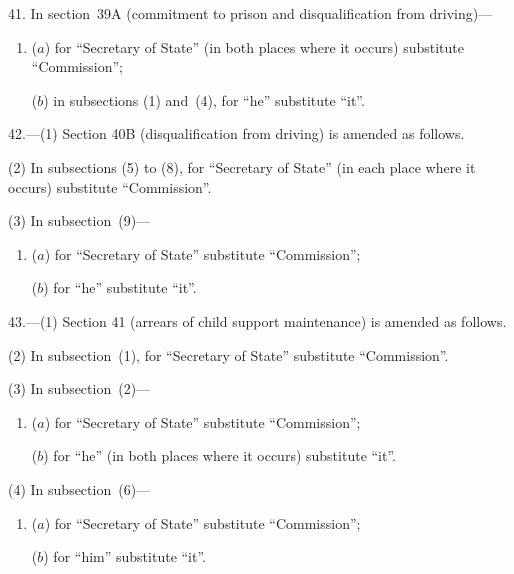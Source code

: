\documentclass[12pt,a4paper]{article}
\begin{document}

\medskip

41. In section~39A (commitment to prison and disqualification from driving)—
\begin{enumerate}\item[]
($a$) for “Secretary of State” (in both places where it occurs) substitute “Commission”;

($b$) in subsections (1) and~(4), for “he” substitute “it”.
\end{enumerate}

\medskip

42.---(1) Section 40B (disqualification from driving) is amended as follows.

(2) In subsections (5) to (8), for “Secretary of State” (in each place where it occurs) substitute “Commission”.

(3) In subsection~(9)—
\begin{enumerate}\item[]
($a$) for “Secretary of State” substitute “Commission”;

($b$) for “he” substitute “it”.
\end{enumerate}

\medskip

43.---(1) Section 41 (arrears of child support maintenance) is amended as follows.

(2) In subsection~(1), for “Secretary of State” substitute “Commission”.

(3) In subsection~(2)—
\begin{enumerate}\item[]
($a$) for “Secretary of State” substitute “Commission”;

($b$) for “he” (in both places where it occurs) substitute “it”.
\end{enumerate}

(4) In subsection~(6)—
\begin{enumerate}\item[]
($a$) for “Secretary of State” substitute “Commission”;

($b$) for “him” substitute “it”.
\end{enumerate}
\end{document}
